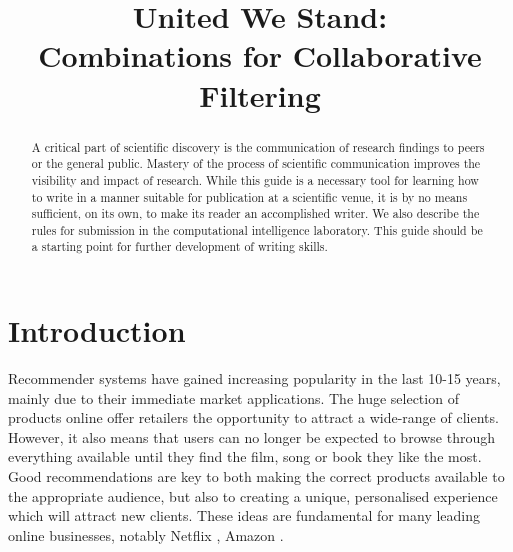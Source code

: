 \documentclass[10pt,conference,compsocconf]{IEEEtran}
\begin{document}
\title{United We Stand:\\ Combinations for Collaborative Filtering}

\author{
	\and
	\and
}

\maketitle

\begin{abstract}
  A critical part of scientific discovery is the
  communication of research findings to peers or the general public.
  Mastery of the process of scientific communication improves the
  visibility and impact of research. While this guide is a necessary
  tool for learning how to write in a manner suitable for publication
  at a scientific venue, it is by no means sufficient, on its own, to
  make its reader an accomplished writer. We also describe the rules
  for submission in the computational intelligence laboratory.
  This guide should be a
  starting point for further development of writing skills.
\end{abstract}

\section{Introduction}

Recommender systems have gained increasing popularity in the last 10-15 years, mainly due to their immediate market applications. The huge selection of products online offer retailers the opportunity to attract a wide-range of clients. However, it also means that users can no longer be expected to browse through everything available until they find the film, song or book they like the most. Good recommendations are key to both making the correct products available to the appropriate audience, but also to creating a unique, personalised experience which will attract new clients. These ideas are fundamental for many leading online businesses, notably Netflix \cite{amatriain2012netflix}, Amazon \cite{linden2003amazon}.
\end{document}
